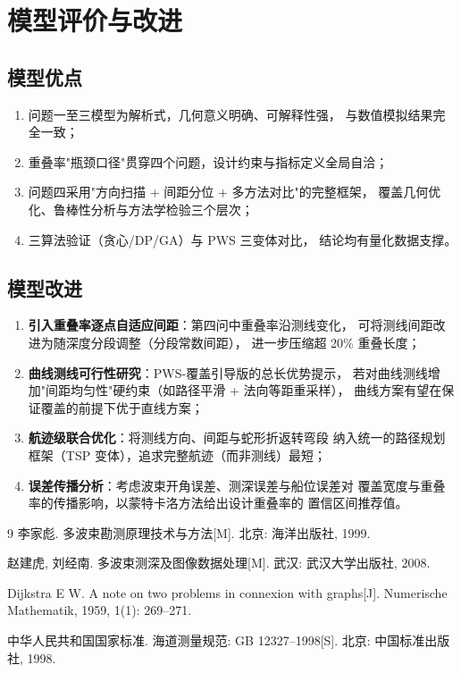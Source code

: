 \documentclass[withoutpreface,bwprint]{cumcmthesis} %
\begin{document}
\section{模型评价与改进}

\subsection{模型优点}

\begin{enumerate}
    \item 问题一至三模型为解析式，几何意义明确、可解释性强，
          与数值模拟结果完全一致；
    \item 重叠率"瓶颈口径"贯穿四个问题，设计约束与指标定义全局自洽；
    \item 问题四采用"方向扫描 + 间距分位 + 多方法对比"的完整框架，
          覆盖几何优化、鲁棒性分析与方法学检验三个层次；
    \item 三算法验证（贪心/DP/GA）与 PWS 三变体对比，
          结论均有量化数据支撑。
\end{enumerate}

\subsection{模型改进}

\begin{enumerate}
    \item \textbf{引入重叠率逐点自适应间距}：第四问中重叠率沿测线变化，
      可将测线间距改进为随深度分段调整（分段常数间距），
      进一步压缩超 20\% 重叠长度；
    \item \textbf{曲线测线可行性研究}：PWS-覆盖引导版的总长优势提示，
      若对曲线测线增加"间距均匀性"硬约束（如路径平滑 + 法向等距重采样），
      曲线方案有望在保证覆盖的前提下优于直线方案；
    \item \textbf{航迹级联合优化}：将测线方向、间距与蛇形折返转弯段
      纳入统一的路径规划框架（TSP 变体），追求完整航迹（而非测线）最短；
    \item \textbf{误差传播分析}：考虑波束开角误差、测深误差与船位误差对
      覆盖宽度与重叠率的传播影响，以蒙特卡洛方法给出设计重叠率的
      置信区间推荐值。
\end{enumerate}

\begin{thebibliography}{9}%
    李家彪. 多波束勘测原理技术与方法[M]. 北京: 海洋出版社, 1999.

    赵建虎, 刘经南. 多波束测深及图像数据处理[M]. 武汉: 武汉大学出版社, 2008.

    Dijkstra E W. A note on two problems in connexion with graphs[J].
    Numerische Mathematik, 1959, 1(1): 269--271.

    中华人民共和国国家标准. 海道测量规范: GB 12327--1998[S].
    北京: 中国标准出版社, 1998.
\end{thebibliography}
\end{document}
